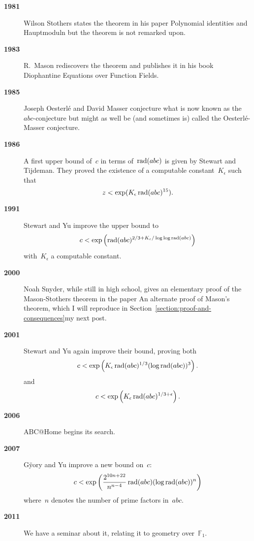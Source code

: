 \begin{description}
  \item[\textbf{1981}] Wilson Stothers states the theorem in his paper Polynomial identities and Hauptmoduln but the theorem is not remarked upon.
  \item[\textbf{1983}] R.\ Mason rediscovers the theorem and publishes it in his book Diophantine Equations over Function Fields.
  \item[\textbf{1985}] Joseph Oesterl\'e and David Masser conjecture what is now known as the~$abc$\nobreakdash-conjecture but might as well be (and sometimes is) called the Oesterl\'e-Masser conjecture.

  \item[\textbf{1986}] A first upper bound of~$c$ in terms of~$\operatorname{rad}(abc)$ is given by Stewart and Tijdeman. They proved the existence of a computable constant~$K_{\epsilon}$ such that
    \begin{equation}
      z<\exp(K_{\epsilon}\operatorname{rad}(abc)^{15}).
    \end{equation}
  \item[\textbf{1991}] Stewart and Yu improve the upper bound to
    \begin{equation}
      c<\exp\left( \operatorname{rad}(abc)^{2/3+K_{\epsilon}/\log\log\operatorname{rad}(abc)} \right)
    \end{equation}
    with~$K_{\epsilon}$ a computable constant.
  \item[\textbf{2000}] Noah Snyder, while still in high school, gives an elementary proof of the Mason-Stothers theorem in the paper An alternate proof of Mason's theorem, which I will reproduce in \iftex Section~\ref{section:proof-and-consequences}\fi\ifblog my next post\fi.
  \item[\textbf{2001}] Stewart and Yu again improve their bound, proving both
    \begin{equation}
      c<\exp\left( K_{\epsilon}\operatorname{rad}(abc)^{1/3}(\log\operatorname{rad}(abc))^3 \right).
    \end{equation}
    and
    \begin{equation}
      c<\exp\left( K_{\epsilon}\operatorname{rad}(abc)^{1/3+\epsilon} \right).
    \end{equation}
  \item[\textbf{2006}] ABC@Home begins its search.

  \item[\textbf{2007}] G\"yory and Yu improve a new bound on~$c$:
    \begin{equation}
      c<\exp\left( \frac{2^{10n+22}}{n^{n-4}}\operatorname{rad}(abc)(\log\operatorname{rad}(abc))^n \right)
    \end{equation}
    where~$n$ denotes the number of prime factors in~$abc$.
  \item[\textbf{2011}] We have a seminar about it, relating it to geometry over~$\mathbb{F}_1$.
\end{description}
